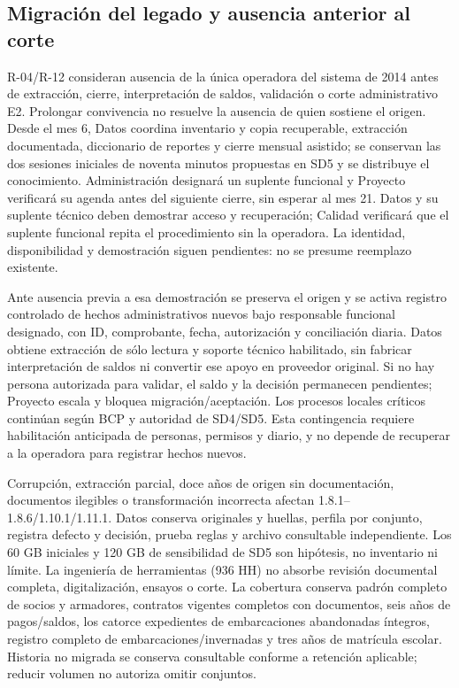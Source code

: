 \subsection{Migración del legado y ausencia anterior al corte}\label{sec:sd8-legado-p05}
R-04/R-12 consideran ausencia de la única operadora del sistema de 2014 antes de extracción, cierre, interpretación de saldos, validación o corte administrativo E2. Prolongar convivencia no resuelve la ausencia de quien sostiene el origen. Desde el mes 6, Datos coordina inventario y copia recuperable, extracción documentada, diccionario de reportes y cierre mensual asistido; se conservan las dos sesiones iniciales de noventa minutos propuestas en SD5 y se distribuye el conocimiento. Administración designará un suplente funcional y Proyecto verificará su agenda antes del siguiente cierre, sin esperar al mes 21. Datos y su suplente técnico deben demostrar acceso y recuperación; Calidad verificará que el suplente funcional repita el procedimiento sin la operadora. La identidad, disponibilidad y demostración siguen pendientes: no se presume reemplazo existente.

Ante ausencia previa a esa demostración se preserva el origen y se activa registro controlado de hechos administrativos nuevos bajo responsable funcional designado, con ID, comprobante, fecha, autorización y conciliación diaria. Datos obtiene extracción de sólo lectura y soporte técnico habilitado, sin fabricar interpretación de saldos ni convertir ese apoyo en proveedor original. Si no hay persona autorizada para validar, el saldo y la decisión permanecen pendientes; Proyecto escala y bloquea migración/aceptación. Los procesos locales críticos continúan según BCP y autoridad de SD4/SD5. Esta contingencia requiere habilitación anticipada de personas, permisos y diario, y no depende de recuperar a la operadora para registrar hechos nuevos. \parencite[cap.~5; RT-05.15; numeral 17.6]{sd8-c07}

Corrupción, extracción parcial, doce años de origen sin documentación, documentos ilegibles o transformación incorrecta afectan 1.8.1--1.8.6/1.10.1/1.11.1. Datos conserva originales y huellas, perfila por conjunto, registra defecto y decisión, prueba reglas y archivo consultable independiente. Los 60 GB iniciales y 120 GB de sensibilidad de SD5 son hipótesis, no inventario ni límite. La ingeniería de herramientas (936 HH) no absorbe revisión documental completa, digitalización, ensayos o corte. La cobertura conserva padrón completo de socios y armadores, contratos vigentes completos con documentos, seis años de pagos/saldos, los catorce expedientes de embarcaciones abandonadas íntegros, registro completo de embarcaciones/invernadas y tres años de matrícula escolar. Historia no migrada se conserva consultable conforme a retención aplicable; reducir volumen no autoriza omitir conjuntos. \parencites[RT-05.11--15; p.~12]{sd8-bt}[RT-05.15]{sd8-c07}

